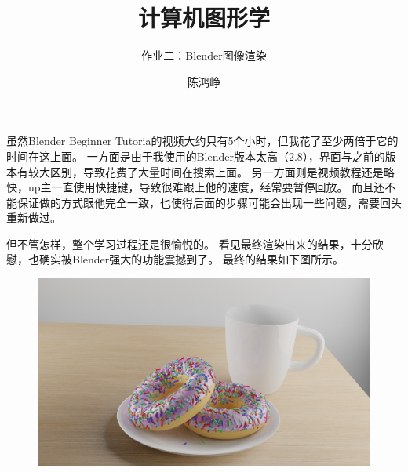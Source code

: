 \documentclass[logo,reportComp]{thesis}
\title{计算机图形学}
\subtitle{作业二：Blender图像渲染}
\author{陈鸿峥}
\begin{document}
\maketitle

虽然Blender Beginner Tutoria的视频大约只有5个小时，但我花了至少两倍于它的时间在这上面。
一方面是由于我使用的Blender版本太高（2.8），界面与之前的版本有较大区别，导致花费了大量时间在搜索上面。
另一方面则是视频教程还是略快，up主一直使用快捷键，导致很难跟上他的速度，经常要暂停回放。
而且还不能保证做的方式跟他完全一致，也使得后面的步骤可能会出现一些问题，需要回头重新做过。

但不管怎样，整个学习过程还是很愉悦的。
看见最终渲染出来的结果，十分欣慰，也确实被Blender强大的功能震撼到了。
最终的结果如下图所示。
\begin{figure}[H]
\centering
\includegraphics[width=\linewidth]{result.png}
\end{figure}
\end{document}
